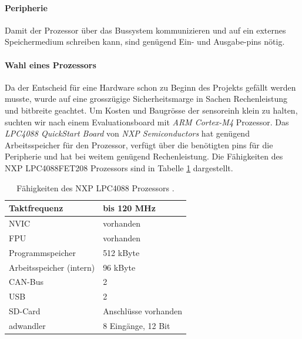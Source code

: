 \paragraph{Peripherie} Damit der Prozessor über das Bussystem kommunizieren und auf ein externes Speichermedium schreiben kann, sind genügend Ein- und Ausgabe-\glspl{pin} nötig.

\paragraph{Wahl eines Prozessors} Da der Entscheid für eine Hardware schon zu Beginn des Projekts gefällt werden musste, wurde auf eine grosszügige Sicherheitsmarge in Sachen Rechenleistung und \gls{bitbreite} geachtet.  Um Kosten und Baugrösse der \gls{sensoreinh} klein zu halten, suchten wir nach einem Evaluationsboard mit \emph{ARM Cortex-M4} Prozessor. Das \emph{LPC4088 QuickStart Board} von \emph{NXP Semiconductors} hat genügend Arbeitsspeicher für den Prozessor, verfügt über die benötigten \glspl{pin} für die Peripherie und hat bei weitem genügend Rechenleistung. Die Fähigkeiten des NXP LPC4088FET208 Prozessors sind in Tabelle \ref{table.lpc4088} dargestellt. 

\begin{table}
\begin{center}
\begin{tabular}{|l|l|}
\hline
\begin{minipage}{38mm}Taktfrequenz\end{minipage} & \begin{minipage}{44mm}bis 120 MHz\end{minipage} \\
\hline
NVIC & vorhanden \\
\hline
FPU & vorhanden \\
\hline
Programmspeicher & 512 kByte \\
\hline
Arbeitsspeicher (intern) & 96 kByte \\
\hline
CAN-Bus & 2 \\
\hline
USB & 2 \\
\hline
SD-Card & Anschlüsse vorhanden \\
\hline
\gls{adwandler} & 8 Eingänge, 12 Bit \\
\hline
\end{tabular}
\caption{Fähigkeiten des NXP LPC4088 Prozessors \cite{nxplpc4088}.}
\label{table.lpc4088}
\end{center}
\end{table}

